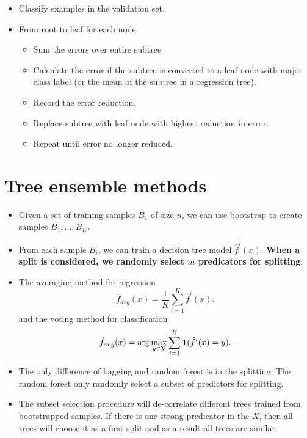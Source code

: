 \begin{refsection}
\begin{method}
\begin{itemize}
	\item Classify examples in the validation set.
	\item From root to leaf for each node
	\begin{itemize}
		\item Sum the errors over entire subtree
		\item Calculate the error if the subtree is converted to a leaf node with major class label (or the mean of the subtree in a regression tree).
		\item Record the error reduction.
	 \item Replace subtree with leaf node with highest reduction in error.
	 \item Repeat until error no longer reduced.
	\end{itemize}
\end{itemize}	
\end{method}




\section{Tree ensemble methods}



\begin{definition}\cite[320]{james2013introduction}\hfill
\begin{itemize}
	\item Given a set of training samples $B_1$ of size $n$, we can use bootstrap to create samples $B_1,...,B_K$. 
	\item From each sample $B_i$, we can train a decision tree model $\hat{f}^i(x)$. \textbf{When a split is considered, we randomly select $m$ predicators for splitting}.
	\item The averaging method for regression
	$$\hat{f}_{avg}(x) = \frac{1}{K}\sum_{i=1}^K \hat{f}^i(x).$$
	and the voting method for classification
	$$\hat{f}_{avg}(x) = \arg\max_{y\in \mathcal{Y}} \sum_{i=1}^K \bm{1}(\hat{f}^i(x) = y).$$
	
\end{itemize}
 
\end{definition}


\begin{remark}[interpretation]\hfill
\begin{itemize}
	\item The only difference of bagging and random forest is in the splitting. The random forest only randomly select a subset of predictors for splitting.
	\item The subset selection procedure will de-correlate different trees trained from bootstrapped samples. If there is one strong predicator in the $X$, then all trees will choose it as a first split and as a result all trees are similar. 
\end{itemize}
\end{remark}


\end{refsection}
